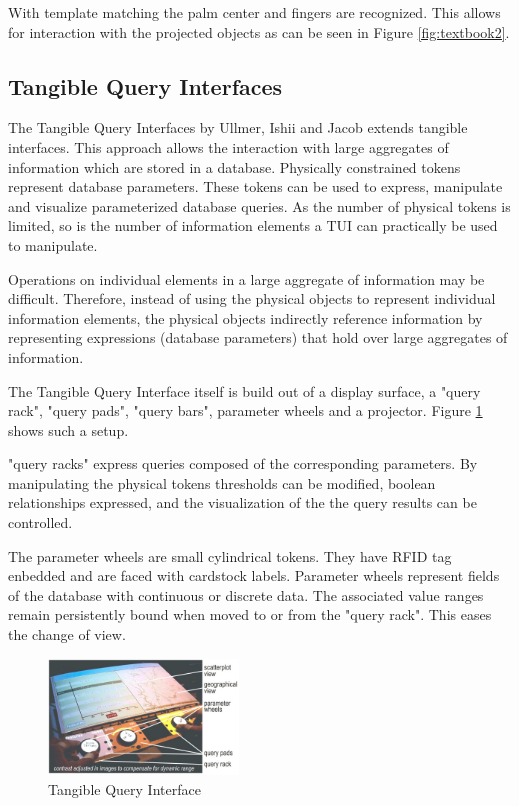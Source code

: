 With template matching the palm center and fingers are recognized. This allows for interaction with the projected objects as can be seen in Figure \ref{fig:textbook2}. 




\subsection{Tangible Query Interfaces}

The Tangible Query Interfaces by Ullmer, Ishii and Jacob \cite{ullmer03} extends tangible interfaces. 
This approach allows the interaction with large aggregates of information which are stored in a database. 
Physically constrained tokens represent database parameters. These tokens can be used to express, manipulate and visualize parameterized database queries. As the number of physical tokens is limited, so is the number of information elements a TUI can practically be used to manipulate. 

Operations on individual elements in a large aggregate of information may be difficult. Therefore, instead of using the physical objects to represent individual information elements, the physical objects indirectly reference information by representing expressions (database parameters) that hold over large aggregates of information.

The Tangible Query Interface itself is build out of a display surface, a "query rack", "query pads", "query bars", parameter wheels and a projector. Figure \ref{fig:tanquery} shows such a setup.

"query racks" express queries composed of the corresponding parameters. 
By manipulating the physical tokens thresholds can be modified, boolean relationships expressed, and the visualization of the the query results can be controlled. 

The parameter wheels are small cylindrical tokens. They have RFID tag enbedded and are faced with cardstock labels. Parameter wheels represent fields of the database with continuous or discrete data. The associated value ranges remain persistently bound when moved to or from the "query rack". This eases the change of view. 

\begin{figure}
\centering
\includegraphics[width=0.45\textwidth]{figures/TangibleQueryInterfaces.jpg}
\caption{Tangible Query Interface}
\label{fig:tanquery}
\end{figure}

